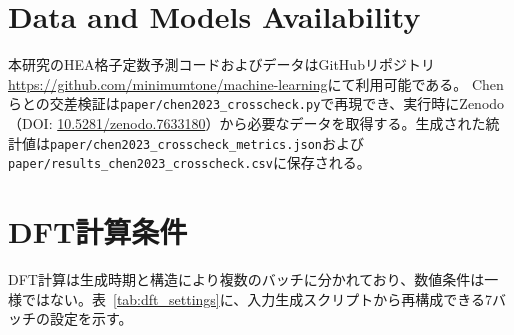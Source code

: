 \documentclass[5p,10pt]{elsarticle}
\begin{document}
\section*{Data and Models Availability}

本研究のHEA格子定数予測コードおよびデータはGitHubリポジトリ\href{https://github.com/minimumtone/machine-learning}{https://github.com/minimumtone/machine-learning}にて利用可能である。
Chenらとの交差検証は\texttt{paper/chen2023\_crosscheck.py}で再現でき、実行時にZenodo（DOI: \href{https://doi.org/10.5281/zenodo.7633180}{10.5281/zenodo.7633180}）から必要なデータを取得する。生成された統計値は\texttt{paper/chen2023\_crosscheck\_metrics.json}および\texttt{paper/results\_chen2023\_crosscheck.csv}に保存される。



\appendix
\renewcommand{\thefigure}{A\arabic{figure}}
\renewcommand{\thetable}{A\arabic{table}}
\renewcommand{\theequation}{A\arabic{equation}}
\setcounter{figure}{0}
\setcounter{table}{0}
\setcounter{equation}{0}

\section{DFT計算条件}
\label{sec:appendix_dft_settings}

DFT計算は生成時期と構造により複数のバッチに分かれており、数値条件は一様ではない。表~\ref{tab:dft_settings}に、入力生成スクリプトから再構成できる7バッチの設定を示す。
\end{document}

